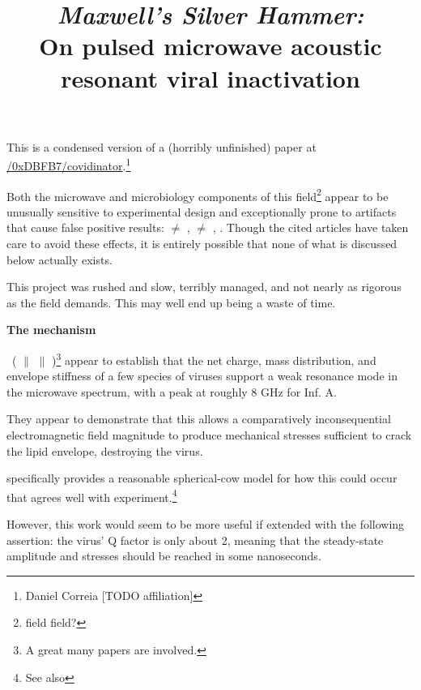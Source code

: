 \documentclass[fleqn,10pt]{paper}
\title{{\it Maxwell's Silver Hammer:}\\ On pulsed microwave acoustic resonant viral inactivation}
\begin{document}
\maketitle


This is a condensed version of a (horribly unfinished) paper at \href{https://www.github.com/0xDBFB7/covidinator/documents/paper.pdf}{\faGithub/0xDBFB7/covidinator}.\footnote{Daniel Correia [TODO affiliation] }






Both the microwave and microbiology components of this field\footnote{field field?} appear to be unusually sensitive to experimental design and exceptionally prone to artifacts that cause false positive results: \cite{Microwave1982} $\neq$ \cite{Resonances1987}, \cite{Effects1985a} $\neq$ \cite{Cytogenetic1986}, \cite{Comprehensive2018}. Though the cited articles have taken care to avoid these effects, it is entirely possible that none of what is discussed below actually exists.  

This project was rushed and slow, terribly managed, and not nearly as rigorous as the field demands. This may well end up being a waste of time.


{\Large \textbf{The mechanism}}


\cite{Microwave2009} \textrightarrow \ (\cite{focusing2014} $\parallel$ \cite{Efficient2015} $\parallel$ \cite{Resonant2017})\footnote{A great many papers are involved.} appear to establish that the net charge, mass distribution, and envelope stiffness of a few species of viruses support a weak resonance mode in the microwave spectrum, with a peak at roughly 8 GHz for Inf. A.

They appear to demonstrate that this allows a comparatively inconsequential electromagnetic field magnitude to produce mechanical stresses sufficient to crack the lipid envelope, destroying the virus.

\cite{Efficient2015} specifically provides a reasonable spherical-cow model for how this could occur that agrees well with experiment.\footnote{See also }

However, this work would seem to be more useful if extended with the following assertion: the virus' Q factor is only about 2, meaning that the steady-state amplitude and stresses should be reached in some nanoseconds.
\end{document}
